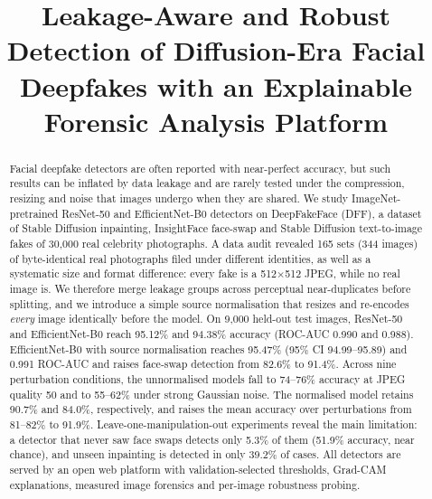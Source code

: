 \documentclass[conference]{IEEEtran}
\begin{document}
\title{Leakage-Aware and Robust Detection of Diffusion-Era Facial Deepfakes with an Explainable Forensic Analysis Platform}

\author{
}

\maketitle

\begin{abstract}
Facial deepfake detectors are often reported with near-perfect accuracy, but such results can be inflated by data leakage and are rarely tested under the compression, resizing and noise that images undergo when they are shared. We study ImageNet-pretrained ResNet-50 and EfficientNet-B0 detectors on DeepFakeFace (DFF), a dataset of Stable Diffusion inpainting, InsightFace face-swap and Stable Diffusion text-to-image fakes of 30{,}000 real celebrity photographs. A data audit revealed 165 sets (344 images) of byte-identical real photographs filed under different identities, as well as a systematic size and format difference: every fake is a 512$\times$512 JPEG, while no real image is. We therefore merge leakage groups across perceptual near-duplicates before splitting, and we introduce a simple source normalisation that resizes and re-encodes \emph{every} image identically before the model. On 9{,}000 held-out test images, ResNet-50 and EfficientNet-B0 reach 95.12\% and 94.38\% accuracy (ROC-AUC 0.990 and 0.988). EfficientNet-B0 with source normalisation reaches 95.47\% (95\% CI 94.99--95.89) and 0.991 ROC-AUC and raises face-swap detection from 82.6\% to 91.4\%. Across nine perturbation conditions, the unnormalised models fall to 74--76\% accuracy at JPEG quality 50 and to 55--62\% under strong Gaussian noise. The normalised model retains 90.7\% and 84.0\%, respectively, and raises the mean accuracy over perturbations from 81--82\% to 91.9\%. Leave-one-manipulation-out experiments reveal the main limitation: a detector that never saw face swaps detects only 5.3\% of them (51.9\% accuracy, near chance), and unseen inpainting is detected in only 39.2\% of cases. All detectors are served by an open web platform with validation-selected thresholds, Grad-CAM explanations, measured image forensics and per-image robustness probing.
\end{abstract}
\end{document}
